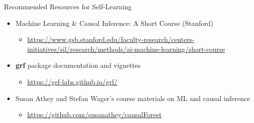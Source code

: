 \documentclass[dvipsnames,hyperref={pdfpagelabels=false}]{beamer}
\begin{document}
\begin{frame}{Recommended Resources for Self-Learning}
	\begin{itemize}
		\item Machine Learning \& Causal Inference: A Short Course (Stanford)
		\vspace{0.2cm}
		\begin{itemize}
			\item \url{https://www.gsb.stanford.edu/faculty-research/centers-initiatives/sil/research/methods/ai-machine-learning/short-course}
			\vspace{0.2cm}
		\end{itemize}
		\item \textbf{grf} package documentation and vignettes
		\vspace{0.2cm}
		\begin{itemize}
			\item \url{https://grf-labs.github.io/grf/}
			\vspace{0.2cm}
		\end{itemize}
		\item Susan Athey and Stefan Wager's course materials on ML and causal inference
		\vspace{0.2cm}
		\begin{itemize}
			\item \url{https://github.com/susanathey/causalForest}
		\end{itemize}
	\end{itemize}
\end{frame}
\end{document}

